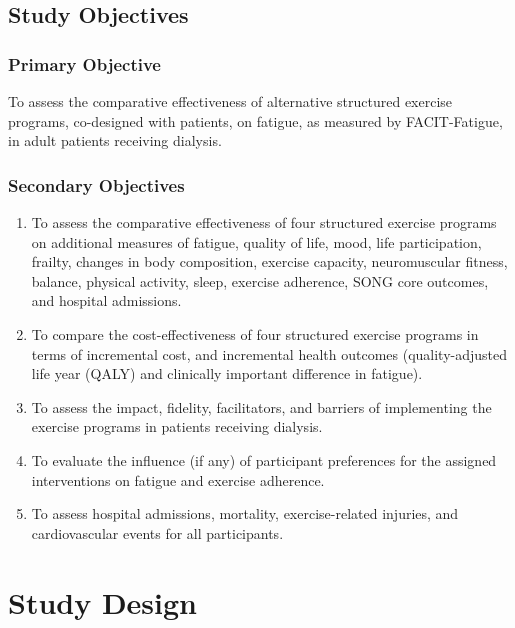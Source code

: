 \documentclass[
]{article}
\begin{document}
\clearpage

\hypertarget{background}{%
  \subsection{Study Objectives}\label{objectives}}


\hypertarget{primary-objective}{
  \subsubsection{Primary Objective}{\label{primary-objective}}
}

To assess the comparative effectiveness of alternative structured exercise programs, co-designed with patients, on fatigue, as measured by FACIT-Fatigue, in adult patients receiving dialysis.

\hypertarget{secondary-objectives}{
  \subsubsection{Secondary Objectives}{\label{secondary-objectives}}
}

\begin{enumerate}
  \def\labelenumi{\arabic{enumi}.}
  \item To assess the comparative effectiveness of four structured exercise programs on additional measures of fatigue, quality of life, mood, life participation, frailty, changes in body composition, exercise capacity, neuromuscular fitness, balance, physical activity, sleep, exercise adherence, SONG core outcomes, and hospital admissions.
  \item To compare the cost-effectiveness of four structured exercise programs in terms of incremental cost, and incremental health outcomes (quality-adjusted life year (QALY) and clinically important difference in fatigue).
  \item To assess the impact, fidelity, facilitators, and barriers of implementing the exercise programs in patients receiving dialysis.
  \item To evaluate the influence (if any) of participant preferences for the assigned interventions on fatigue and exercise adherence.
  \item To assess hospital admissions, mortality, exercise-related injuries, and cardiovascular events for all participants.
\end{enumerate}

\clearpage

\hypertarget{study-design}{%
  \section{Study Design}\label{study-design}}
\end{document}
